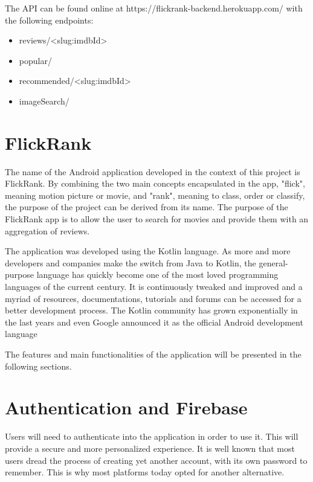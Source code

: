 \documentclass[12pt,a4paper,twoside]{report}
\begin{document}
The API can be found online at https://flickrank-backend.herokuapp.com/ with the following endpoints:
\begin{itemize}
    \item reviews/<slug:imdbId>
    \item popular/
    \item recommended/<slug:imdbId>
    \item imageSearch/
\end{itemize}
\pagebreak


\section{FlickRank}
The name of the Android application developed in the context of this project is FlickRank. By combining the two main concepts encapsulated in the app, "flick", meaning motion picture or movie, and "rank", meaning to class, order or classify, the purpose of the project can be derived from its name. The purpose of the FlickRank app is to allow the user to search for movies and provide them with an aggregation of reviews.

The application was developed using the Kotlin language. As more and more developers and companies make the switch from Java to Kotlin, the general-purpose language has quickly become one of the most loved programming languages of the current century. It is continuously tweaked and improved and a myriad of resources, documentations, tutorials and forums can be accessed for a better development process. The Kotlin community has grown exponentially in the last years and even Google announced it as the official Android development language

The features and main functionalities of the application will be presented in the following sections.


\section{Authentication and Firebase}
Users will need to authenticate into the application in order to use it. This will provide a secure and more personalized experience. It is well known that most users dread the process of creating yet another account, with its own password to remember. This is why most platforms today opted for another alternative.
\end{document}
